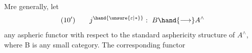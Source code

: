 Mre generally,  let
\[ (10') \qquad j^{\hand{\unsure{\varepsilon|*}}}: \ B \hand{\longrightarrow} A^{\wedge} \]
any aspheric functor with respect to the standard asphericity structure
of $A^{\wedge}$, where B is any small category.     The corresponding functor



